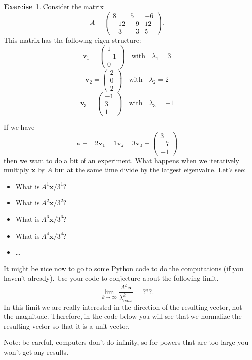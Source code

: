 \documentclass[
]{book}
\providecommand{\tightlist}{%
  \setlength{\itemsep}{0pt}\setlength{\parskip}{0pt}}
\theoremstyle{definition}
\theoremstyle{definition}
\theoremstyle{definition}
\newtheorem{exercise}{Exercise}[chapter]
\theoremstyle{remark}
\begin{document}
\begin{exercise}
\protect\hypertarget{exr:unnamed-chunk-362}{}{\label{exr:unnamed-chunk-362} }Consider the matrix
\[ A = \begin{pmatrix} 8 & 5 & -6 \\ -12 & -9 & 12 \\ -3 & -3 & 5 \end{pmatrix}. \]
This matrix has the following eigen-structure:
\[ \boldsymbol{v}_1 = \begin{pmatrix} 1\\-1\\0\end{pmatrix} \quad \text{with} \quad \lambda_1 = 3 \]
\[ \boldsymbol{v}_2 = \begin{pmatrix} 2\\0\\2\end{pmatrix} \quad \text{with} \quad \lambda_2 = 2 \]
\[ \boldsymbol{v}_3 = \begin{pmatrix} -1\\3\\1\end{pmatrix} \quad \text{with} \quad \lambda_3 = -1 \]

If we have
\[ \boldsymbol{x} = -2 \boldsymbol{v}_1 + 1 \boldsymbol{v}_2 - 3 \boldsymbol{v}_3 = \begin{pmatrix} 3 \\ -7 \\ -1 \end{pmatrix} \]
then we want to do a bit of an experiment. What happens when we iteratively multiply \(\boldsymbol{x}\) by \(A\) but at the same time divide by the largest eigenvalue. Let's see:

\begin{itemize}
\tightlist
\item
  What is \(A^1 \boldsymbol{x} / 3^1\)?
\item
  What is \(A^2 \boldsymbol{x} / 3^2\)?
\item
  What is \(A^3 \boldsymbol{x} / 3^3\)?
\item
  What is \(A^4 \boldsymbol{x} / 3^4\)?
\item
  \ldots{}
\end{itemize}

It might be nice now to go to some Python code to do the computations (if you haven't already). Use your code to conjecture about the following limit.
\[ \lim_{k \to \infty} \frac{A^k \boldsymbol{x}}{\lambda_{max}^k} = ???. \]
In this limit we are really interested in the direction of the resulting vector, not the magnitude. Therefore, in the code below you will see that we normalize the resulting vector so that it is a unit vector.

Note: be careful, computers don't do infinity, so for powers that are too large you won't get any results.
\end{exercise}
\end{document}
